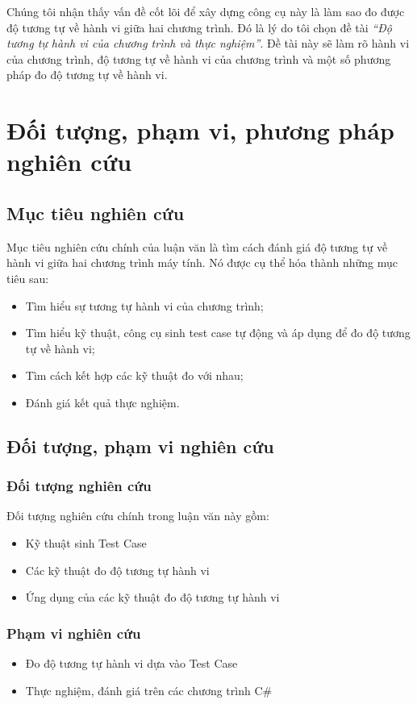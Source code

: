 Chúng tôi nhận thấy vấn đề cốt lõi để xây dựng công cụ này là làm sao
đo được độ tương tự về hành vi giữa hai chương trình. Đó là lý do tôi chọn đề tài \emph{``Độ tương tự hành vi của chương trình và thực nghiệm''}. Đề tài này  sẽ làm rõ hành vi của chương trình, độ tương tự về hành vi của chương trình và một số phương pháp đo độ tương tự về hành vi.

\section{Đối tượng, phạm vi, phương pháp nghiên cứu}
\subsection*{Mục tiêu nghiên cứu}

Mục tiêu nghiên cứu chính của luận văn là tìm cách đánh giá độ tương tự về hành vi giữa hai chương trình máy tính. Nó được cụ thể hóa thành những mục tiêu sau:
\begin{itemize}
\item Tìm hiểu sự tương tự hành vi của chương trình;
\item Tìm hiểu kỹ thuật, công cụ sinh test case tự động và áp dụng để
  đo độ tương tự về hành vi;
\item Tìm cách kết hợp các kỹ thuật đo với nhau;
\item Đánh giá kết quả thực nghiệm.
\end{itemize}

\subsection*{Đối tượng, phạm vi nghiên cứu}

\subsubsection*{Đối tượng nghiên cứu}

Đối tượng nghiên cứu chính trong luận văn này gồm:
\begin{itemize}
\item Kỹ thuật sinh Test Case
\item Các kỹ thuật đo độ tương tự hành vi
\item Ứng dụng của các kỹ thuật đo độ tương tự hành vi
\end{itemize}
	
\subsubsection*{Phạm vi nghiên cứu}
\begin{itemize}
\item Đo độ tương tự hành vi dựa vào Test Case
\item Thực nghiệm, đánh giá trên các chương trình C\#
\end{itemize}


